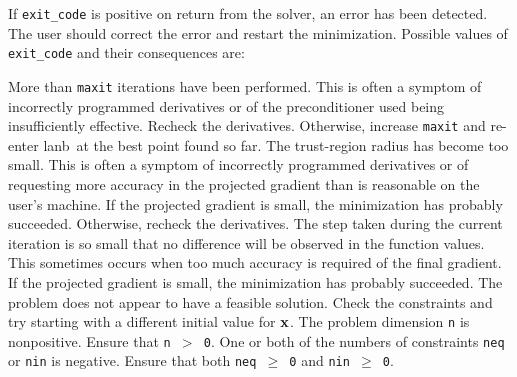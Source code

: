 \documentclass{galahad}
\newcommand{\package}{lanb}
\begin{document}
If {\tt exit\_code} is positive
on return from the solver, an error has been detected.
The user should correct the error and restart the minimization.
Possible values of {\tt exit\_code} and their consequences are:
\begin{description}
 More than {\tt maxit} iterations have been 
      performed. This is often a symptom of incorrectly programmed
      derivatives or of the preconditioner used being
      insufficiently effective. Recheck the derivatives.
      Otherwise, increase {\tt maxit} and re-enter \package\
      at the best point found so far.
 The trust-region radius
      has become too small. This is
      often a symptom of incorrectly programmed derivatives
      or of requesting more accuracy in the projected gradient
      than is reasonable on the user's machine.
      If the projected gradient
      is small, the minimization
      has probably succeeded. Otherwise, recheck the derivatives.
\itt{exit\_code $= 3.$} The step taken during the current iteration is so
      small that
      no difference will be observed in the function values.
      This sometimes occurs when too much accuracy is required of
      the final gradient. If the projected gradient
      is small, the minimization has probably succeeded.
 The problem does not appear to have a feasible
     solution. Check the constraints and try starting with a different
     initial value for ${\mathbf{x}}$.
 The problem dimension
     {\tt n} is nonpositive. Ensure that {\tt n $>$ 0}.
 One or both of the numbers of constraints
      {\tt neq} or {\tt nin} is negative. Ensure that both {\tt neq $\geq$ 0} 
      and {\tt nin $\geq$ 0}.
\end{description}

\galinfo
\end{document}
